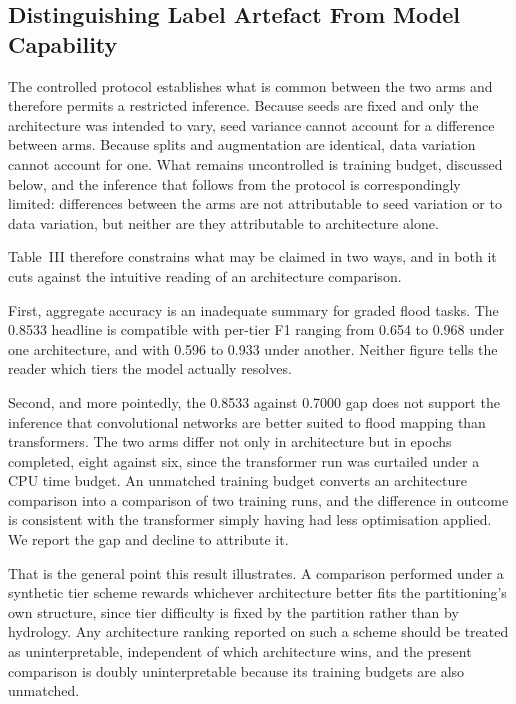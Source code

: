 \documentclass[11pt,journal]{IEEEtran}
\begin{document}
\subsection{Distinguishing Label Artefact From Model Capability}

The controlled protocol establishes what is common between the two arms and
therefore permits a restricted inference. Because seeds are fixed and only the
architecture was intended to vary, seed variance cannot account for a
difference between arms. Because splits and augmentation are identical, data
variation cannot account for one. What remains uncontrolled is training budget,
discussed below, and the inference that follows from the protocol is
correspondingly limited: differences between the arms are not attributable to
seed variation or to data variation, but neither are they attributable to
architecture alone.

Table~III therefore constrains what may be claimed in two ways, and in both it
cuts against the intuitive reading of an architecture comparison.

First, aggregate accuracy is an inadequate summary for graded flood tasks. The
0.8533 headline is compatible with per-tier F1 ranging from 0.654 to 0.968 under
one architecture, and with 0.596 to 0.933 under another. Neither figure tells
the reader which tiers the model actually resolves.

Second, and more pointedly, the 0.8533 against 0.7000 gap does not support the
inference that convolutional networks are better suited to flood mapping than
transformers. The two arms differ not only in architecture but in epochs
completed, eight against six, since the transformer run was curtailed under a
CPU time budget. An unmatched training budget converts an architecture
comparison into a comparison of two training runs, and the difference in
outcome is consistent with the transformer simply having had less optimisation
applied. We report the gap and decline to attribute it.

That is the general point this result illustrates. A comparison performed under
a synthetic tier scheme rewards whichever architecture better fits the
partitioning's own structure, since tier difficulty is fixed by the partition
rather than by hydrology. Any architecture ranking reported on such a scheme
should be treated as uninterpretable, independent of which architecture wins,
and the present comparison is doubly uninterpretable because its training
budgets are also unmatched.
\end{document}
